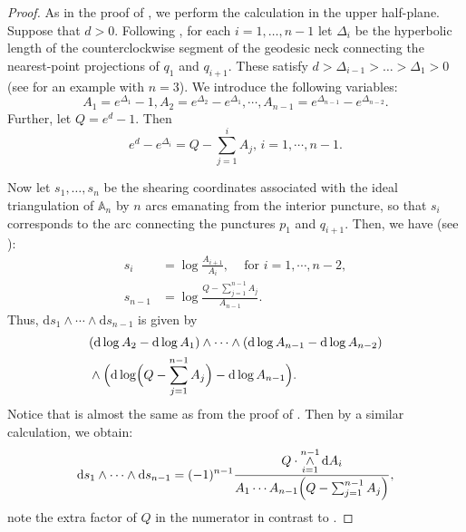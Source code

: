 \documentclass{amsart}
\renewcommand{\AA}{\mathbb{A}}
\theoremstyle{definition}
\begin{document}
\begin{proof}
As in the proof of , we perform the calculation in the upper half-plane. Suppose that $d>0$. Following \cite[Page~7]{chekhov2024}, for each $i=1,\dotsc,n-1$ let $\Delta_i$ be the hyperbolic length of the counterclockwise segment of the geodesic neck connecting the nearest-point projections of $q_1$ and $q_{i+1}$. These satisfy $d>\Delta_{i-1}>\dotsc>\Delta_1>0$ (see  for an example with $n=3$).  We introduce the following variables:
\[
A_1 = e^{\Delta_1}-1, A_2 = e^{\Delta_2}-e^{\Delta_1}, \cdots, A_{n-1} = e^{\Delta_{n-1}}-e^{\Delta_{n-2}}.
\]
Further, let $Q = e^{d}-1$. Then 
\begin{equation}
\label{eq:Q-sumA}
e^{d}-e^{\Delta_{i}} = Q-\sum_{j=1}^i A_j, \, i=1,\cdots,n-1.
\end{equation}

Now let $s_1, \dotsc, s_n$ be the shearing coordinates associated with the ideal triangulation of $\AA_n$ by $n$ arcs emanating from the interior puncture, so that $s_i$ corresponds to the arc connecting the punctures $p_1$ and $q_{i+1}$. Then, we have (see ):
\begin{align*}
s_i &= \log \frac{A_{i+1}}{A_i},\,\quad \text{for }i = 1, \cdots, n-2,
\\
s_{n-1} &= \log\frac{Q-\sum_{j=1}^{n-1} A_j}{A_{n-1}}.
\end{align*}
Thus, $\mathrm{d}s_1 \wedge \cdots \wedge \mathrm{d}s_{n-1}$ is given by
\begin{equation}
\label{eq:vol-form-crown-A-var}   
\begin{split}
& (\mathrm{d}\log A_2-\mathrm{d}\log A_1)\wedge\cdots\wedge(\mathrm{d}\log A_{n-1}-\mathrm{d}\log A_{n-2})  \\ & \wedge\Bigl(\mathrm{d}\log \Bigl(Q-\sum_{j=1}^{n-1} A_j \Bigr)-\mathrm{d}\log A_{n-1}\Bigr).
\end{split}
\end{equation}
Notice that  is almost the same as  from the proof of . Then by a similar calculation, we obtain:
\begin{equation}
\label{eq:vol-form-crown-A-var-2} 
\mathrm{d}s_1 \wedge \cdots \wedge \mathrm{d}s_{n-1} = (-1)^{n-1}\frac{Q\cdot\mathop{\wedge}\limits_{i=1}^{n-1} \mathrm{d}A_i }{A_1\cdots A_{n-1}\Bigl(Q-\sum_{j=1}^{n-1} A_j \Bigr)},
\end{equation}
note the extra factor of $Q$ in the numerator in contrast to .\medskip


\end{proof}
\end{document}
